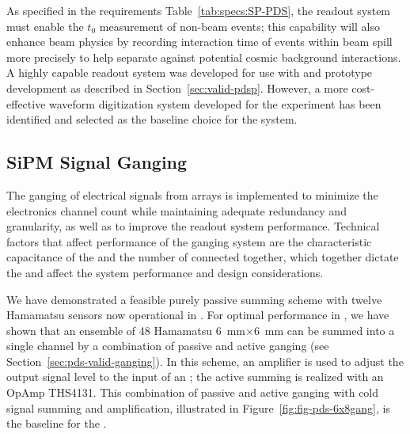As specified in the requirements Table~\ref{tab:specs:SP-PDS}, the readout system must enable the $t_0$ measurement of non-beam events; this capability will also enhance beam physics by recording interaction time of events within 
beam spill more precisely to help separate against potential cosmic background interactions. A highly capable readout system was developed for use with  and prototype development as described in Section~\ref{sec:valid-pdsp}. However, a more cost-effective waveform digitization system developed for the  experiment has been identified and selected as the baseline choice for the  system. 


\subsection{SiPM Signal Ganging}
\label{sec:pds-design-ganging}

The ganging of electrical signals from  arrays is implemented to minimize the electronics channel count while maintaining adequate redundancy and granularity, as well as to improve the readout system performance.  
Technical factors that affect performance of the ganging system are the characteristic capacitance of the  and the number of  connected together, which together dictate the  and affect the system performance and design considerations.

We have demonstrated a feasible purely passive summing scheme with twelve Hamamatsu  sensors now operational in . For optimal performance in , we have shown that an ensemble of 48 Hamamatsu \SI{6}{mm}$\times$\SI{6}{mm}  can be summed into a single channel by a combination of passive and active ganging (see Section~\ref{sec:pds-valid-ganging}).  In this scheme, an amplifier is used to adjust the  output signal level to the input of an ; the active summing is realized with an OpAmp THS4131. This combination of passive and active ganging with cold signal summing and amplification, illustrated in Figure~\ref{fig:fig-pds-6x8gang}, is the baseline for the .

